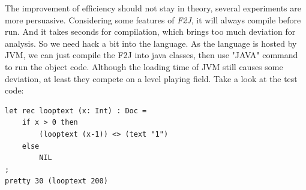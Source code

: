 The improvement of efficiency should not stay in theory, several experiments are more persuasive. Considering some features of \textit{F2J}, it will always compile before run. And it takes seconds for compilation, which brings too much deviation for analysis. So we need hack a bit into the language. As the language is hosted by JVM, we can just compile the F2J into java classes, then use "JAVA" command to run the object code. Although the loading time of JVM still causes some deviation, at least they compete on a level playing field. Take a look at the test code:
\begin{lstlisting}
let rec looptext (x: Int) : Doc =
    if x > 0 then
        (looptext (x-1)) <> (text "1")
    else
        NIL
;
pretty 30 (looptext 200)
\end{lstlisting}

